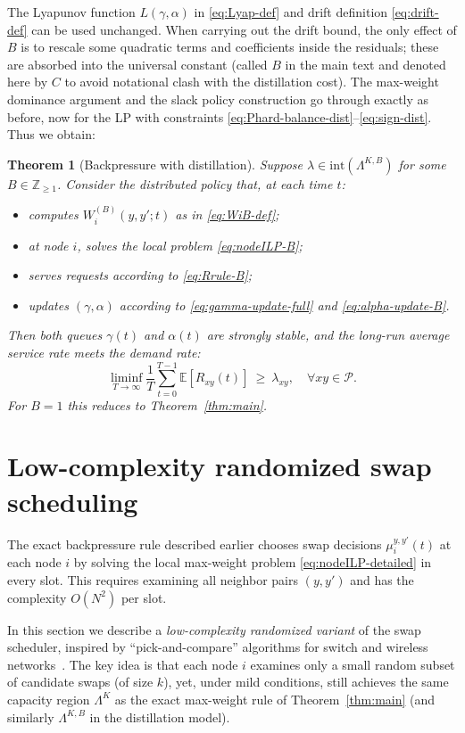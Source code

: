 \documentclass[11pt]{article}
\newtheorem{theorem}{Theorem}
\newcommand{\E}{\mathbb{E}}
\newcommand{\Pairs}{\mathcal{P}} %
\begin{document}
The Lyapunov function $L(\gamma,\alpha)$ in \eqref{eq:Lyap-def} and
drift definition \eqref{eq:drift-def} can be used unchanged. When
carrying out the drift bound, the only effect of $B$ is to rescale
some quadratic terms and coefficients inside the residuals; these
are absorbed into the universal constant (called $B$ in the main
text and denoted here by $C$ to avoid notational clash with the
distillation cost). The max-weight dominance argument and the slack
policy construction go through exactly as before, now for the LP
with constraints \eqref{eq:Phard-balance-dist}--\eqref{eq:sign-dist}.
Thus we obtain:

\begin{theorem}[Backpressure with distillation]
Suppose $\lambda\in\mathrm{int}(\Lambda^{K,B})$ for some
$B\in\mathbb{Z}_{\ge 1}$. Consider the distributed policy that, at
each time $t$:
\begin{itemize}[leftmargin=2em]
\item computes $W_i^{(B)}(y,y';t)$ as in \eqref{eq:WiB-def};
\item at node $i$, solves the local problem \eqref{eq:nodeILP-B};
\item serves requests according to \eqref{eq:Rrule-B};
\item updates $(\gamma,\alpha)$ according to
\eqref{eq:gamma-update-full} and \eqref{eq:alpha-update-B}.
\end{itemize}
Then both queues $\gamma(t)$ and $\alpha(t)$ are strongly stable, and
the long-run average service rate meets the demand rate:
\[
\liminf_{T\to\infty}
\frac1T \sum_{t=0}^{T-1}\E[R_{xy}(t)]
\ \ge\ \lambda_{xy},
\quad \forall xy\in\Pairs.
\]
For $B=1$ this reduces to Theorem~\ref{thm:main}.
\end{theorem}

\section{Low-complexity randomized swap scheduling}
\label{sec:randomized}

The exact backpressure rule described earlier chooses swap decisions
$\mu_i^{y,y'}(t)$ at each node $i$ by solving the local max-weight
problem \eqref{eq:nodeILP-detailed} in every slot. This requires
examining all neighbor pairs $(y,y')$ and has the complexity $O(N^2)$
per slot.

In this section we describe a \emph{low-complexity randomized variant}
of the swap scheduler, inspired by ``pick-and-compare'' algorithms for
switch and wireless networks~\cite{tassiulas-1998-linear, eryilmaz-osm-2010}. The key idea is that each node $i$ examines only a small random subset of candidate swaps (of size $k$), yet, under mild conditions, still achieves the same capacity region
$\Lambda^K$ as the exact max-weight rule of Theorem~\ref{thm:main}
(and similarly $\Lambda^{K,B}$ in the distillation model).





\printbibliography
\end{document}
